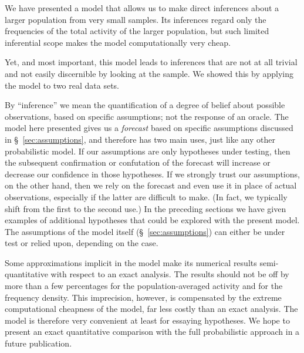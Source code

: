 \documentclass[\ifafour a4paper,12pt,\else a5paper,10pt,\fi%
onecolumn,oneside,article,%
british%
]{memoir}
\theoremstyle{remark}
\theoremstyle{innote}
\renewcommand*{\|}{\nonscript\,\vert\nonscript\;\mathopen{}}
\newcommand*{\sect}{\S}%
\newcommand*{\puzzle}{{\fontencoding{U}\fontfamily{fontawesometwo}\selectfont\symbol{225}}}
\newcommand{\mynote}[1]{ {\color{notecolour}\puzzle\ #1}}
\begin{document}
We have presented a model that allows us to make direct inferences about a
larger population from very small samples. Its inferences regard only the
frequencies of the total activity of the larger population, but such
limited inferential scope makes the model computationally very cheap.

Yet, and most important, this model leads to inferences that are not at all
trivial and not easily discernible by looking at the sample. We showed this
by applying the model to two real data sets.

By \enquote{inference} we mean the quantification of a degree of belief
about possible observations, based on specific assumptions; not the
response of an oracle. The model here presented gives us a \emph{forecast}
based on specific assumptions discussed in \sect~\ref{sec:assumptions}, and
therefore has two main uses, just like any other probabilistic model. If
our assumptions are only hypotheses under testing, then the subsequent
confirmation or confutation of the forecast will increase or decrease our
confidence in those hypotheses. If we strongly trust our assumptions, on
the other hand, then we rely on the forecast and even use it in place of
actual observations, especially if the latter are difficult to make. (In
fact, we typically shift from the first to the second use.) In the
preceding sections we have given examples of additional hypotheses that
could be explored with the present model. The assumptions of the model
itself (\sect~\ref{sec:assumptions}) can either be under test or relied
upon, depending on the case.

Some approximations implicit in the model make its numerical results
semi-quantitative with respect to an exact analysis. The results should not
be off by more than a few percentages for the population-averaged activity and
for the frequency density. This imprecision, however, is compensated by the
extreme computational cheapness of the model, far less costly than an exact
analysis. The model is therefore very convenient at least for essaying
hypotheses. We hope to present an exact quantitative comparison with the
full probabilistic approach in a future publication.



\end{document}
